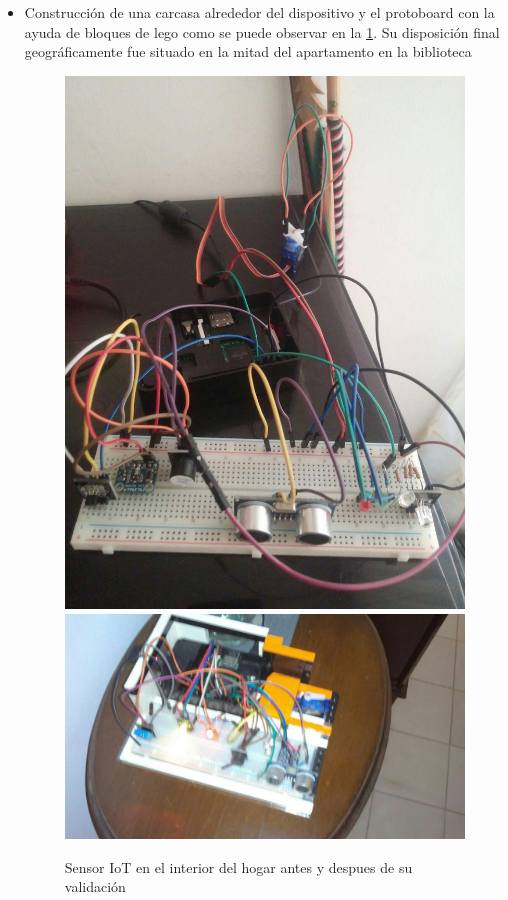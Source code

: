 \begin{itemize}
\item Construcción de una carcasa alrededor del dispositivo y el protoboard con la ayuda de bloques de lego como se puede observar en la \ref{fig:rpi3javier_indoor}. Su disposición final geográficamente fue situado en la mitad del apartamento en la biblioteca 
\begin{figure}[!htb]
\centering
\includegraphics[scale=0.165]{./Figuras/rpi3javier_proto.jpg}
\includegraphics[scale=0.22]{./Figuras/rpi3javier_final.jpg}
\caption{Sensor IoT en el interior del hogar antes y despues de su validación}
\label{fig:rpi3javier_indoor}
\vspace*{-10pt}
\end{figure}
\end{itemize} 

